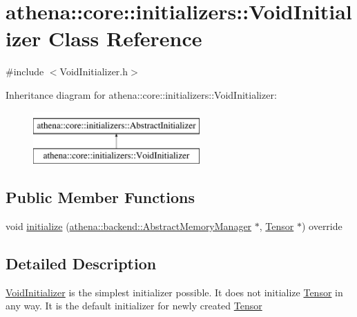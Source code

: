 \hypertarget{classathena_1_1core_1_1initializers_1_1_void_initializer}{}\section{athena\+:\+:core\+:\+:initializers\+:\+:Void\+Initializer Class Reference}
\label{classathena_1_1core_1_1initializers_1_1_void_initializer}


{\ttfamily \#include $<$Void\+Initializer.\+h$>$}

Inheritance diagram for athena\+:\+:core\+:\+:initializers\+:\+:Void\+Initializer\+:\begin{figure}[H]
\begin{center}
\leavevmode
\includegraphics[height=2.000000cm]{classathena_1_1core_1_1initializers_1_1_void_initializer}
\end{center}
\end{figure}
\subsection*{Public Member Functions}
\begin{DoxyCompactItemize}
\item 
void \mbox{\hyperlink{classathena_1_1core_1_1initializers_1_1_void_initializer_adcb637175e8cad5841cb21e53e0e138f}{initialize}} (\mbox{\hyperlink{classathena_1_1backend_1_1_abstract_memory_manager}{athena\+::backend\+::\+Abstract\+Memory\+Manager}} $\ast$, \mbox{\hyperlink{classathena_1_1core_1_1_tensor}{Tensor}} $\ast$) override
\end{DoxyCompactItemize}


\subsection{Detailed Description}
\mbox{\hyperlink{classathena_1_1core_1_1initializers_1_1_void_initializer}{Void\+Initializer}} is the simplest initializer possible. It does not initialize \mbox{\hyperlink{classathena_1_1core_1_1_tensor}{Tensor}} in any way. It is the default initializer for newly created \mbox{\hyperlink{classathena_1_1core_1_1_tensor}{Tensor}} 

